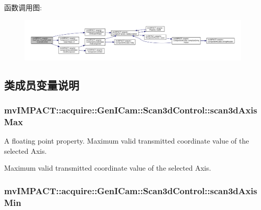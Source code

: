 函数调用图\+:
\nopagebreak
\begin{figure}[H]
\begin{center}
\leavevmode
\includegraphics[width=350pt]{classmv_i_m_p_a_c_t_1_1acquire_1_1_gen_i_cam_1_1_scan3d_control_a9bb83fe01c85b71aa80fb359e74a0d46_cgraph}
\end{center}
\end{figure}




\subsection{类成员变量说明}
\hypertarget{classmv_i_m_p_a_c_t_1_1acquire_1_1_gen_i_cam_1_1_scan3d_control_a7052c2bf595e8e55ef796250715c207c}{
\subsubsection[{scan3d\+Axis\+Max}]{ mv\+I\+M\+P\+A\+C\+T\+::acquire\+::\+Gen\+I\+Cam\+::\+Scan3d\+Control\+::scan3d\+Axis\+Max}}\label{classmv_i_m_p_a_c_t_1_1acquire_1_1_gen_i_cam_1_1_scan3d_control_a7052c2bf595e8e55ef796250715c207c}


A floating point property. Maximum valid transmitted coordinate value of the selected Axis. 

Maximum valid transmitted coordinate value of the selected Axis. \hypertarget{classmv_i_m_p_a_c_t_1_1acquire_1_1_gen_i_cam_1_1_scan3d_control_aabaa82663dc20332e2533f8b24f58549}{
\subsubsection[{scan3d\+Axis\+Min}]{ mv\+I\+M\+P\+A\+C\+T\+::acquire\+::\+Gen\+I\+Cam\+::\+Scan3d\+Control\+::scan3d\+Axis\+Min}}\label{classmv_i_m_p_a_c_t_1_1acquire_1_1_gen_i_cam_1_1_scan3d_control_aabaa82663dc20332e2533f8b24f58549}


